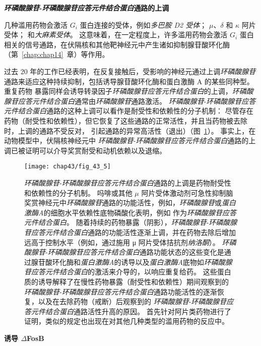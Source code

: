 \textbf{\textit{环磷酸腺苷}-\textit{环磷酸腺苷应答元件结合蛋白}通路的上调}

几种滥用药物会激活 $ G_i $ 蛋白连接的受体，例如\textit{多巴胺 D2 受体}；
$ \mu $、$ \delta $ 和 $ \kappa $ 阿片受体；
和\textit{大麻素受体}。
这意味着，在一定程度上，许多滥用药物会激活 $ G_i $ 蛋白相关的信号通路，在伏隔核和其他靶神经元中产生诸如抑制腺苷酸环化酶（第~\ref{chap:chap14}~章）等作用。


过去 20 年的工作已经表明，在反复接触后，受影响的神经元通过上调\textit{环磷酸腺苷}通路来适应这种持续抑制，包括诱导腺苷酸环化酶和蛋白激酶 A 的某些同种型。
重复药物 暴露同样会诱导转录因子\textit{环磷酸腺苷应答元件结合蛋白}的上调，\textit{环磷酸腺苷应答元件结合蛋白}通常由\textit{环磷酸腺苷}通路激活。
\textit{环磷酸腺苷}-\textit{环磷酸腺苷应答元件结合蛋白}通路的这种上调可以看作是耐受性和依赖性的分子机制：
尽管存在药物（耐受性和依赖性），但它恢复了这些通路的正常活性，并且当药物被去除时，上调的通路不受反对， 引起通路的异常高活性（退出）（图~\ref{fig:43_5}）。
事实上，在动物模型中，伏隔核神经元中 \textit{环磷酸腺苷}-\textit{环磷酸腺苷应答元件结合蛋白}通路的上调已被证明可以介导奖赏耐受和动机依赖以及退缩。


\begin{figure}[htbp]
	\centering
	\texttt{[image: chap43/fig\_43\_5]}
	\caption{\textit{环磷酸腺苷}-\textit{环磷酸腺苷应答元件结合蛋白}通路的上调是药物耐受性和依赖性的分子机制。
		吗啡或其他 $\mu$ 阿片受体激动剂可急性抑制脑奖赏神经元中\textit{环磷酸腺苷}通路的功能活性，例如，\textit{环磷酸腺苷}或\textit{蛋白激酶A}的细胞水平依赖性底物磷酸化表明，例如 作为\textit{环磷酸腺苷应答元件结合蛋白}。
		随着持续的药物暴露（阴影），\textit{环磷酸腺苷}-\textit{环磷酸腺苷应答元件结合蛋白}通路的功能活性逐渐上调，并在药物去除后增加远高于控制水平（例如，通过施用 μ 阿片受体拮抗剂\textit{纳洛酮}）。 \textit{环磷酸腺苷}-\textit{环磷酸腺苷应答元件结合蛋白}通路功能状态的这些变化是通过腺苷酸环化酶和\textit{蛋白激酶A}的诱导以及\textit{蛋白激酶A}底物如\textit{环磷酸腺苷应答元件结合蛋白}的激活来介导的，以响应重复给药。
		这些蛋白质的诱导解释了在慢性药物暴露（耐受性和依赖性）期间观察到的 \textit{环磷酸腺苷}-\textit{环磷酸腺苷应答元件结合蛋白}通路功能活性的逐渐恢复，以及在去除药物（戒断）后观察到的 \textit{环磷酸腺苷}-\textit{环磷酸腺苷应答元件结合蛋白}通路活性升高的原因。
		首先针对阿片类药物进行了证明，类似的规定也出现在对其他几种类型的滥用药物的反应中\cite{trimble2002molecular}。}
	\label{fig:43_5}
\end{figure}


\textbf{诱导 $\Delta$FosB}


